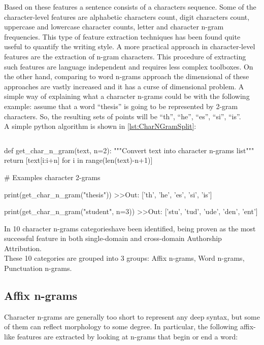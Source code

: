 Based on these features a sentence consists of a characters sequence. Some of the character-level features are alphabetic characters count, digit characters count, uppercase and lowercase character counts, letter and character n-gram frequencies. This type of feature extraction techniques has been found quite useful to quantify the writing style.\cite{grieve2007quantitative}
A more practical approach in character-level features are the extraction of n-gram characters. This procedure of extracting such features are language independent and requires less complex toolboxes. On the other hand, comparing to word n-grams approach the dimensional of these approaches are vastly increased and it has a curse of dimensional problem. A simple way of explaining what a character n-grams could be with the following example: assume that a word “thesis” is going to be represented by 2-gram characters. So, the resulting sets of points will be {\enquote{th}, \enquote{he}, \enquote{es}, \enquote{si}, \enquote{is}}.\\
A simple python algorithm is shown in \ref{lst:CharNGramSplit}:\\

\begin{lstlisting}[frame=none,caption={Split word into character n-grams, parametric on n.},captionpos=b,label=lst:CharNGramSplit]
\end{lstlisting}
\begin{python}
	def get_char_n_gram(text, n=2):
		"""Convert text into character n-grams list"""
		return [text[i:i+n] for i in range(len(text)-n+1)]
	
	# Examples character 2-grams
	
	print(get_char_n_gram("thesis"))
	>>Out: ['th', 'he', 'es', 'si', 'is']
	
	print(get_char_n_gram("student", n=3))
	>>Out: ['stu', 'tud', 'ude', 'den', 'ent']
\end{python}


In \cite{sapkota2015not}  10 character n-grams categorieshave been identified, being proven as the most successful feature in both single-domain and cross-domain Authorship Attribution.\\
These 10 categories are grouped into 3 groups: Affix n-grams, Word n-grams, Punctuation n-grams.

\subsection{Affix n-grams}
Character n-grams are generally too short to represent any deep syntax, but some of them can reflect morphology to some degree. In particular, the following affix-like features are extracted by looking at n-grams that begin or end a word:

